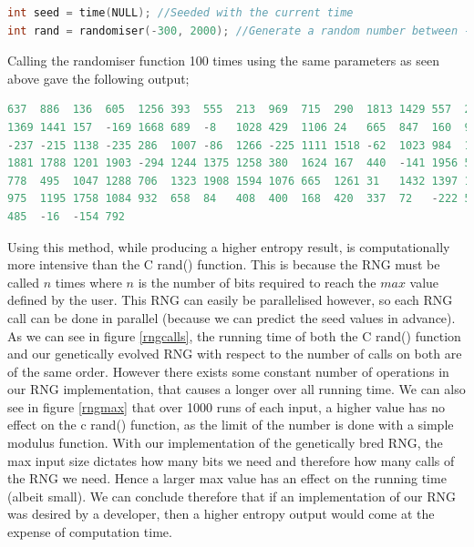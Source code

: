 \documentclass[a4paper,10.5pt]{article}
\begin{document}
\begin{lstlisting}[language=C, basicstyle=\small]
int seed = time(NULL); //Seeded with the current time
int rand = randomiser(-300, 2000); //Generate a random number between -300 and 2000
\end{lstlisting}
Calling the randomiser function 100 times using the same parameters as seen above gave the following output;

\begin{lstlisting}[language=C, basicstyle=\small]
637  886  136  605  1256 393  555  213  969  715  290  1813 1429 557  26   1317 
1369 1441 157  -169 1668 689  -8   1028 429  1106 24   665  847  160  940  -144
-237 -215 1138 -235 286  1007 -86  1266 -225 1111 1518 -62  1023 984  1218 1235
1881 1788 1201 1903 -294 1244 1375 1258 380  1624 167  440  -141 1956 557  -273
778  495  1047 1288 706  1323 1908 1594 1076 665  1261 31   1432 1397 166  279
975  1195 1758 1084 932  658  84   408  400  168  420  337  72   -222 561  -122
485  -16  -154 792

\end{lstlisting}
Using this method, while producing a higher entropy result, is computationally more intensive than the C rand() function. This is because the RNG must be called $n$ times where $n$ is the number of bits required to reach the $max$ value defined by the user. This RNG can easily be parallelised however, so each RNG call can be done in parallel (because we can predict the seed values in advance). As we can see in figure \ref{rngcalls}, the running time of both the C rand() function and our genetically evolved RNG with respect to the number of calls on both are of the same order. However there exists some constant number of operations in our RNG implementation, that causes a longer over all running time. We can also see in figure \ref{rngmax} that over 1000 runs of each input, a higher value has no effect on the c rand() function, as the limit of the number is done with a simple modulus function. With our implementation of the genetically bred RNG, the max input size dictates how many bits we need and therefore how many calls of the RNG we need. Hence a larger max value has an effect on the running time (albeit small). We can conclude therefore that if an implementation of our RNG was desired by a developer, then a higher entropy output would come at the expense of computation time.
\end{document}
